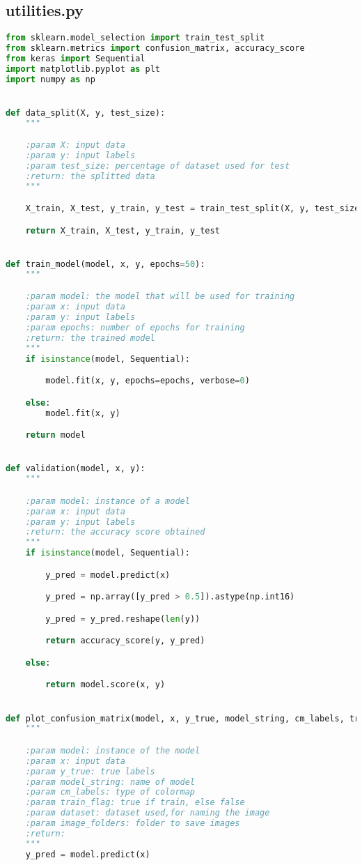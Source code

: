 \documentclass[11pt,a4paper]{article}
\begin{document}
\subsection{utilities.py}
\begin{lstlisting}[language=Python,basicstyle=\tiny]
from sklearn.model_selection import train_test_split
from sklearn.metrics import confusion_matrix, accuracy_score
from keras import Sequential
import matplotlib.pyplot as plt
import numpy as np


def data_split(X, y, test_size):
    """

    :param X: input data
    :param y: input labels
    :param test_size: percentage of dataset used for test
    :return: the splitted data
    """

    X_train, X_test, y_train, y_test = train_test_split(X, y, test_size=test_size, random_state=42)

    return X_train, X_test, y_train, y_test


def train_model(model, x, y, epochs=50):
    """

    :param model: the model that will be used for training
    :param x: input data
    :param y: input labels
    :param epochs: number of epochs for training
    :return: the trained model
    """
    if isinstance(model, Sequential):

        model.fit(x, y, epochs=epochs, verbose=0)

    else:
        model.fit(x, y)

    return model


def validation(model, x, y):
    """

    :param model: instance of a model
    :param x: input data
    :param y: input labels
    :return: the accuracy score obtained
    """
    if isinstance(model, Sequential):

        y_pred = model.predict(x)

        y_pred = np.array([y_pred > 0.5]).astype(np.int16)

        y_pred = y_pred.reshape(len(y))

        return accuracy_score(y, y_pred)

    else:

        return model.score(x, y)


def plot_confusion_matrix(model, x, y_true, model_string, cm_labels, train_flag, dataset, image_folders="Output/Images"):
    """

    :param model: instance of the model
    :param x: input data
    :param y_true: true labels
    :param model_string: name of model
    :param cm_labels: type of colormap
    :param train_flag: true if train, else false
    :param dataset: dataset used,for naming the image
    :param image_folders: folder to save images
    :return:
    """
    y_pred = model.predict(x)


\end{lstlisting}
\end{document}
